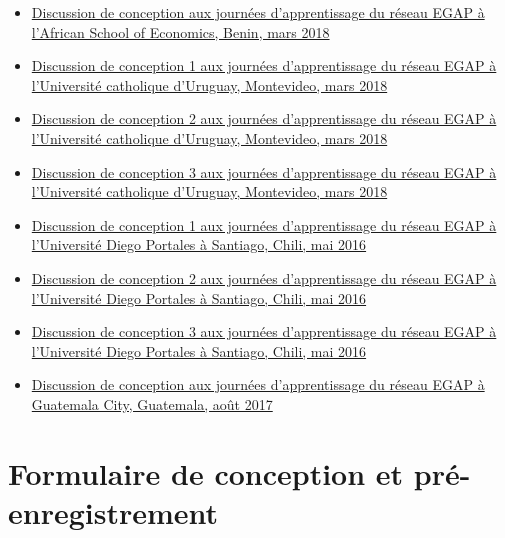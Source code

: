 \documentclass[
  12pt,
]{book}
\begin{document}
\begin{itemize}
\item
  \href{https://egap.github.io/learningdays-resources/Slides/Examples/research_design_2-benin.pdf}{Discussion de conception aux journées d'apprentissage du réseau EGAP à l'African School of Economics, Benin, mars 2018}
\item
  \href{https://egap.github.io/learningdays-resources/Slides/Examples/research_design_1-montevideo.pdf}{Discussion de conception 1 aux journées d'apprentissage du réseau EGAP à l'Université catholique d'Uruguay, Montevideo, mars 2018}
\item
  \href{https://egap.github.io/learningdays-resources/Slides/Examples/research_design_2-montevideo.pdf}{Discussion de conception 2 aux journées d'apprentissage du réseau EGAP à l'Université catholique d'Uruguay, Montevideo, mars 2018}
\item
  \href{https://egap.github.io/learningdays-resources/Slides/Examples/research_design_3-montevideo.pdf}{Discussion de conception 3 aux journées d'apprentissage du réseau EGAP à l'Université catholique d'Uruguay, Montevideo, mars 2018}
\item
  \href{https://egap.github.io/learningdays-resources/Slides/Examples/research_design_1-santiago.pdf}{Discussion de conception 1 aux journées d'apprentissage du réseau EGAP à l'Université Diego Portales à Santiago, Chili, mai 2016}
\item
  \href{https://egap.github.io/learningdays-resources/Slides/Examples/research_design_2-santiago.pdf}{Discussion de conception 2 aux journées d'apprentissage du réseau EGAP à l'Université Diego Portales à Santiago, Chili, mai 2016}
\item
  \href{https://egap.github.io/learningdays-resources/Slides/Examples/research_design_3-santiago.pdf}{Discussion de conception 3 aux journées d'apprentissage du réseau EGAP à l'Université Diego Portales à Santiago, Chili, mai 2016}
\item
  \href{https://egap.github.io/learningdays-resources/Slides/Examples/research_design-guatemala.pdf}{Discussion de conception aux journées d'apprentissage du réseau EGAP à Guatemala City, Guatemala, août 2017}
\end{itemize}

\hypertarget{formulaire-de-conception-et-pruxe9-enregistrement}{%
\section{Formulaire de conception et pré-enregistrement}\label{formulaire-de-conception-et-pruxe9-enregistrement}}
\end{document}
